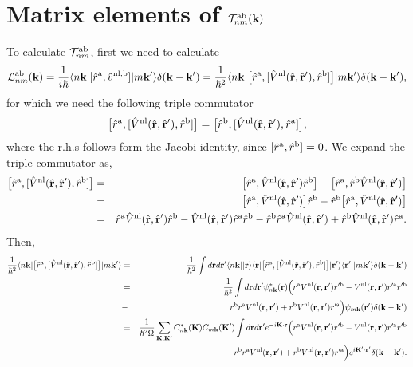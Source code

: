\section{Matrix elements of \texorpdfstring{$\calt^{\rma\rmb}_{nm}(\bfk)$}{tnm}}\label{calt}
To calculate $\calt^{\rma\rmb}_{nm}$, first
we need to calculate
\begin{eqnarray}\label{3.1}
\call^{\rma\rmb}_{nm}(\bfk)=\frac{1}{i\hbar}
\bra{n\bfk}
[\hat r^{\rma},\hat v^{\nl,\rmb}]
\ket{m\bfk'}\gd(\bfk-\bfk')
=
\frac{1}{\hbar^2}
\bra{n\bfk}
\big[\hat r^{\rma},[\hat V^\nl(\hat\bfr,\hat\bfr'),\hat r^\rmb]\big]
\ket{m\bfk'}\gd(\bfk-\bfk')
,
\end{eqnarray} 
for which we need the following triple commutator
\begin{eqnarray}\label{3.2}
\big[\hat r^{\rma},[\hat V^\nl(\hat\bfr,\hat\bfr'),\hat r^\rmb]\big]
=
\big[\hat r^{\rmb},[\hat V^\nl(\hat\bfr,\hat\bfr'),\hat r^\rma]\big]
,
\end{eqnarray} 
where the r.h.s follows form the Jacobi identity, since $[\hat
r^\rma,\hat r^\rmb]=0$.
 We expand  the triple commutator as,
\begin{eqnarray}\label{3.3}
\big[\hat r^{\rma},[\hat V^\nl(\hat\bfr,\hat\bfr'),\hat r^\rmb]\big]
&=&
\big[\hat r^{\rma},
\hat V^\nl(\hat\bfr,\hat\bfr')\hat r^\rmb
\big]
-
\big[\hat r^{\rma},
\hat r^\rmb\hat V^\nl(\hat\bfr,\hat\bfr')
\big]
\nonumber\\
&=&
\big[\hat r^{\rma},
\hat V^\nl(\hat\bfr,\hat\bfr')
\big]\hat r^\rmb
-
\hat r^\rmb
\big[\hat r^{\rma},
\hat V^\nl(\hat\bfr,\hat\bfr')
\big]
\nonumber\\
&=&
\hat r^{\rma}
\hat V^\nl(\hat\bfr,\hat\bfr')
\hat r^\rmb
-
\hat V^\nl(\hat\bfr,\hat\bfr')
\hat r^\rma
\hat r^{\rmb}
-
\hat r^\rmb
\hat r^{\rma}
\hat V^\nl(\hat\bfr,\hat\bfr')
+
\hat r^\rmb
\hat V^\nl(\hat\bfr,\hat\bfr')
\hat r^{\rma}
.
\end{eqnarray}
Then,
\begin{eqnarray}\label{3.5}
\frac{1}{\hbar^2}
\bra{n\bfk}
\big[\hat r^{\rma},[\hat V^\nl(\hat\bfr,\hat\bfr'),\hat r^\rmb]\big]
\ket{m\bfk'}
&=&
\frac{1}{\hbar^2}
\int d\bfr d\bfr'
\bra{n\bfk}
\ket{\bfr}\bra{\bfr}
\big[\hat r^{\rma},[\hat V^\nl(\hat\bfr,\hat\bfr'),\hat r^\rmb]\big]
\ket{\bfr'}\bra{\bfr'}
\ket{m\bfk'}\gd(\bfk-\bfk')
\nonumber\\
&=&
\frac{1}{\hbar^2}
\int d\bfr d\bfr'
\psi^*_{n\bfk}(\bfr)
\Big(
r^{\rma}
V^\nl(\bfr,\bfr')
r'^\rmb
-
V^\nl(\bfr,\bfr')
r'^\rma
r'^{\rmb}
\nonumber\\
&-&
r^\rmb
r^{\rma}
V^\nl(\bfr,\bfr')
+
 r^\rmb
V^\nl(\bfr,\bfr')
r'^{\rma}
\Big) 
\psi_{m\bfk}(\bfr')
\gd(\bfk-\bfk')
\nonumber\\
&=&
\frac{1}{\hbar^2\gO}
\sum_{\bfK,\bfK'} 
C^*_{n\bfk}(\bfK) 
C_{m\bfk}(\bfK')
\int
d\bfr d\bfr'
 e^{-i\bfK\cdot\bfr}
\Big(
r^{\rma}
V^\nl(\bfr,\bfr')
r'^\rmb
-
V^\nl(\bfr,\bfr')
r'^\rma
r'^{\rmb}
\nonumber\\
&-&
r^\rmb
r^{\rma}
V^\nl(\bfr,\bfr')
+
 r^\rmb
V^\nl(\bfr,\bfr')
r'^{\rma}
\Big) 
 e^{i\bfK'\cdot\bfr'}
\gd(\bfk-\bfk')
.
\end{eqnarray} 
